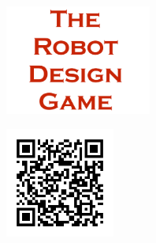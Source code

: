 \documentclass[11pt]{article}
\begin{document}
            
	
	\begin{center}
		\vfill
		\vfill
		\vfill

		\includegraphics[height=3.6cm]{rdg_logo}%
		
		\vfill

		\includegraphics[height=3.6cm]{loud_speaker-qr}%

		\vfill
	\end{center}
\end{document}
